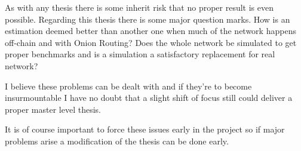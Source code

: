\documentclass[10pt, titlepage, oneside, a4paper]{article}
\begin{document}
As with any thesis there is some inherit risk that no proper result is even possible. Regarding this thesis there is some 
major question marks. How is an estimation deemed better than another one when much of the network happens off-chain and with Onion Routing? Does the whole network be simulated to get proper benchmarks and is a simulation a satisfactory replacement for real network?

I believe these problems can be dealt with and if they're to become insurmountable I have no doubt that a slight shift of focus
still could deliver a proper master level thesis.

It is of course important to force these issues early in the project so if major problems arise a modification of the thesis can be done early.

\newpage



\end{document}
